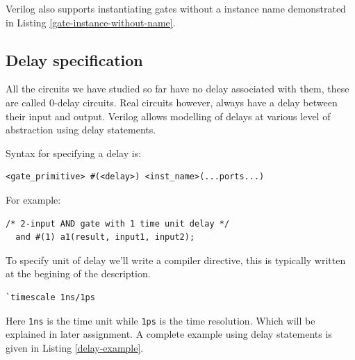 \documentclass[a4paper,10pt]{article}
\theoremstyle{mytheor}
\newcommand{
  \insertverilog}[3]{
  
}
\begin{document}
\insertverilog{./verilog_files/gateLevelExample.v}{gate-level-impl}{\text{Example module using Gate-level modelling}}

Verilog also supports instantiating gates without a instance name
demonstrated in Listing \ref{gate-instance-without-name}.
\insertverilog{./verilog_files/unnamedGate.v}{gate-instance-without-name}{\text{Instantiating unnamed gates}}

\subsection{Delay specification}
All the circuits we have studied so far have no delay associated with
them, these are called 0-delay circuits. Real circuits however, always
have a delay between their input and output. Verilog allows modelling
of delays at various level of abstraction using delay statements.

Syntax for specifying a delay is:
\begin{lstlisting}[style=verilog-inline-style, xleftmargin=0.2\textwidth]
  <gate_primitive> #(<delay>) <inst_name>(...ports...) 
\end{lstlisting}

For example:
\begin{lstlisting}[style=verilog-inline-style, xleftmargin=0.25\textwidth]
  /* 2-input AND gate with 1 time unit delay */
  and #(1) a1(result, input1, input2);
\end{lstlisting}

\vspace{0.1cm}
To specify unit of delay we'll write a compiler
directive, this is typically written at the begining of the
description.

\begin{center}
  \begin{lstlisting}[style=verilog-inline-style,xleftmargin=.35\textwidth]
    `timescale 1ns/1ps
  \end{lstlisting}
\end{center}


Here \lstinline[upquote=true]{1ns} is the time unit while
\lstinline[upquote=true]{1ps} is the time resolution. Which will be
explained in later assignment. A complete example using delay
statements is given in Listing \ref{delay-example}.

\insertverilog{./verilog_files/delayExample.v}{delay-example}{\text{Example usage of delays statement to specify propagation delay of logic gates.}}
\end{document}
